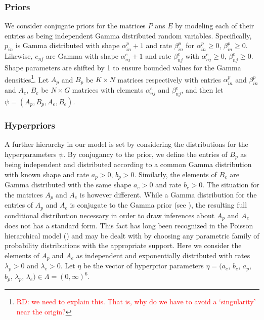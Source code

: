 \documentclass{bioinfo}
\begin{document}
\subsubsection{Priors} 
We consider conjugate priors for the matrices $P$ ans $E$ by modeling
each of their entries as being independent Gamma distributed random
variables. Specifically, $p_{in}$ is Gamma distributed with shape
$\alpha_{in}^p + 1$ and rate $\beta_{in}^p$ for $\alpha_{in}^p
\geqslant 0$, $\beta_{in}^p \geqslant 0$. Likewise, $e_{nj}$ are Gamma
with shape $\alpha_{nj}^e+1$ and rate $\beta_{nj}^e$ with
$\alpha_{nj}^e \geqslant 0$, $\beta_{nj}^e \geqslant 0$. Shape
parameters are shifted by 1 to ensure bounded values for the Gamma
densities\footnote{\textcolor{red}{RD: we need to explain this.  That
is, why do we have to avoid a `singularity' near the origin?}}. Let
$A_p$ and $B_p$ be $K\times N$ matrices respectively with entries
$\alpha_{in}^p$ and $\beta_{in}^p$ and $A_e$, $B_e$ be $N\times G$
matrices with elements $\alpha_{nj}^e$ and $\beta_{nj}^e$, and then
let $\psi = (A_p, B_p, A_e, B_e)$.

\subsubsection{Hyperpriors} 
A further hierarchy in our model is set by considering the
distributions for the hyperparameters
$\psi$. By conjugancy to the prior, we
define the entries of $B_p$ as being independent and distributed
according to a common Gamma distribution with known shape and rate
$a_p > 0$, $b_p > 0$. Similarly, the elements of $B_e$ are Gamma
distributed with the same shape $a_e>0$ and rate $b_e>0$. The
situation for the matrices $A_p$ and $A_e$ is however different. While
a Gamma distribution for the entries of $A_p$ and
$A_e$ is conjugate to the Gamma prior (see \citealp{M}), the resulting
full conditional distribution necessary in order to draw inferences
about $A_p$ and $A_e$ does not has a standard form.  This fact has
long been recognized in the Poisson hierarchical model
(\citealp{GMS93}) and may be dealt with by choosing any parametric
family of probability distributions with the appropriate support. Here
we consider the elements of $A_p$ and $A_e$ as independent and
exponentially distributed with rates $\lambda_p > 0$ and $\lambda_e >
0$.  Let $\eta$ be the vector of hyperprior parameters $\eta = (a_e$,
$b_e$, $a_p$, $b_p$, $\lambda_p$, $\lambda_e) \in \Lambda =
(0, \infty)^6$.
\end{document}
